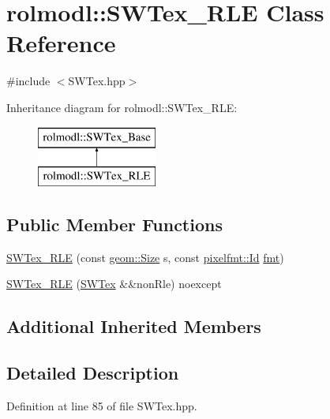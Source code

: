 \hypertarget{classrolmodl_1_1_s_w_tex___r_l_e}{}\section{rolmodl\+::S\+W\+Tex\+\_\+\+R\+LE Class Reference}
\label{classrolmodl_1_1_s_w_tex___r_l_e}


{\ttfamily \#include $<$S\+W\+Tex.\+hpp$>$}

Inheritance diagram for rolmodl\+::S\+W\+Tex\+\_\+\+R\+LE\+:\begin{figure}[H]
\begin{center}
\leavevmode
\includegraphics[height=2.000000cm]{classrolmodl_1_1_s_w_tex___r_l_e}
\end{center}
\end{figure}
\subsection*{Public Member Functions}
\begin{DoxyCompactItemize}
\item 
\mbox{\hyperlink{classrolmodl_1_1_s_w_tex___r_l_e_a1895097431164ea0c840f465d6c7d006}{S\+W\+Tex\+\_\+\+R\+LE}} (const \mbox{\hyperlink{structrolmodl_1_1geom_1_1_size}{geom\+::\+Size}} s, const \mbox{\hyperlink{namespacerolmodl_1_1pixelfmt_a96282713e4465ba9211c8fd3a702b52b}{pixelfmt\+::\+Id}} \mbox{\hyperlink{classrolmodl_1_1_s_w_tex___base_a71436a7fc7e3be9c94d55e772ceb25fa}{fmt}})
\item 
\mbox{\hyperlink{classrolmodl_1_1_s_w_tex___r_l_e_a13818d825e237cdf77ed7e0687642d3c}{S\+W\+Tex\+\_\+\+R\+LE}} (\mbox{\hyperlink{classrolmodl_1_1_s_w_tex}{S\+W\+Tex}} \&\&non\+Rle) noexcept
\end{DoxyCompactItemize}
\subsection*{Additional Inherited Members}


\subsection{Detailed Description}


Definition at line 85 of file S\+W\+Tex.\+hpp.



